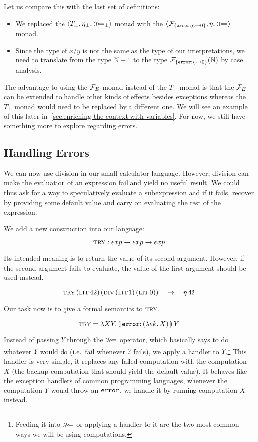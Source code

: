 Let us compare this with the last set of definitions:

\begin{itemize}
\item We replaced the $\left< T_\bot, \eta_\bot, \mathbin{\gg\!=}_\bot \right>$ monad
  with the $\left< \mathcal{F}_{\{\mathtt{error} : \chi \rightarrowtail 0\}}, \eta, \mathbin{\gg\!=} \right>$ monad.
\item Since the type of $x / y$ is not the same as the type of our
  interpretations, we need to translate from the type $\mathbb{N} + 1$ to the type
  $\mathcal{F}_{\{\mathtt{error} : \chi \rightarrowtail 0\}}(\mathbb{N})$ by case analysis.
\end{itemize}

The advantage to using the $\mathcal{F}_E$ monad instead of the $T_\bot$ monad is
that the $\mathcal{F}_E$ can be extended to handle other kinds of effects besides
exceptions whereas the $T_\bot$ monad would need to be replaced by a
different one. We will see an example of this later
in~\ref{sec:enriching-the-context-with-variables}. For now, we still have
something more to explore regarding errors.


\subsection{Handling Errors}

We can now use division in our small calculator language. However, division
can make the evaluation of an expression fail and yield no useful
result. We could thus ask for a way to speculatively evaluate a
subexpression and if it fails, recover by providing some default value and
carry on evaluating the rest of the expression.

We add a new construction into our language:

$$
\textsc{try} : exp \to exp \to exp
$$

Its intended meaning is to return the value of its second
argument. However, if the second argument fails to evaluate, the value of
the first argument should be used instead.

$$
\textsc{try}\,(\textsc{lit}\,42)\,(\textsc{div}\,(\textsc{lit}\,1)\,(\textsc{lit}\,0))
\quad \to \quad \eta\,42
$$

Our task now is to give a formal semantics to $\textsc{try}$.

$$
\trye = \lam{X Y}{\ap{\banana{\onto{\op{error}}{(\lam{e k}{X})}}}{Y}}
$$

Instead of passing $Y$ through the $\mathbin{\gg\!=}$ operator, which basically says
to do whatever $Y$ would do (i.e.\ fail whenever $Y$ fails), we apply a
handler to $Y$.\footnote{Feeding it into $\mathbin{\gg\!=}$ or applying a handler to
  it are the two most common ways we will be using computations.} This
handler is very simple, it replaces any failed computation with the
computation $X$ (the backup computation that should yield the default
value). It behaves like the exception handlers of common programming
languages, whenever the computation $Y$ would throw an $\mathtt{error}$, we
handle it by running computation $X$ instead.

